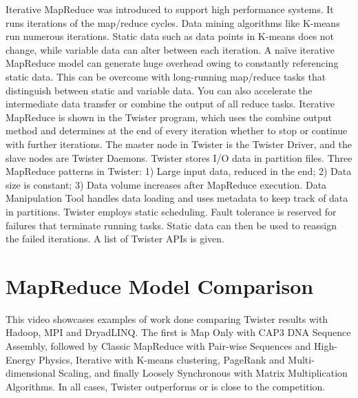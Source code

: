 Iterative MapReduce was introduced to support high performance systems.
It runs iterations of the map/reduce cycles. Data mining algorithms like
K-means run numerous iterations. Static data such as data points in
K-means does not change, while variable data can alter between each
iteration. A naïve iterative MapReduce model can generate huge overhead
owing to constantly referencing static data. This can be overcome with
long-running map/reduce tasks that distinguish between static and
variable data. You can also accelerate the intermediate data transfer or
combine the output of all reduce tasks. Iterative MapReduce is shown in
the Twister program, which uses the combine output method and determines
at the end of every iteration whether to stop or continue with further
iterations. The master node in Twister is the Twister Driver, and the
slave nodes are Twister Daemons. Twister stores I/O data in partition
files. Three MapReduce patterns in Twister: 1) Large input data, reduced
in the end; 2) Data size is constant; 3) Data volume increases after
MapReduce execution. Data Manipulation Tool handles data loading and
uses metadata to keep track of data in partitions. Twister employs
static scheduling. Fault tolerance is reserved for failures that
terminate running tasks. Static data can then be used to reassign the
failed iterations. A list of Twister APIs is given.



\section{MapReduce Model Comparison}

This video showcases examples of work done comparing Twister results
with Hadoop, MPI and DryadLINQ. The first is Map Only with CAP3 DNA
Sequence Assembly, followed by Classic MapReduce with Pair-wise
Sequences and High-Energy Physics, Iterative with K-means clustering,
PageRank and Multi-dimensional Scaling, and finally Loosely Synchronous
with Matrix Multiplication Algorithms. In all cases, Twister outperforms
or is close to the competition.



